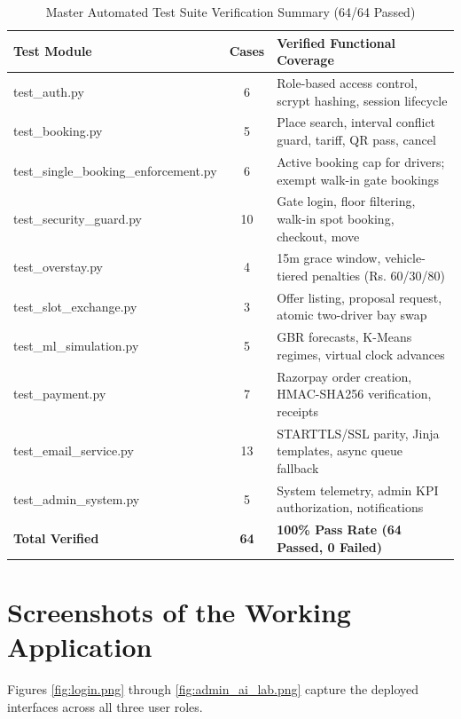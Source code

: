 \documentclass[12pt,a4paper,oneside]{report}
\begin{document}
\begin{table}[H]
\centering
\caption{Master Automated Test Suite Verification Summary (64/64 Passed)}
\label{tab:test_summary}
\begin{tabularx}{\textwidth}{>{\ttfamily}p{5.5cm} c X}
\toprule
\textbf{Test Module} & \textbf{Cases} & \textbf{Verified Functional Coverage} \\
\midrule
test\_auth.py & 6 & Role-based access control, scrypt hashing, session lifecycle \\
test\_booking.py & 5 & Place search, interval conflict guard, tariff, QR pass, cancel \\
test\_single\_booking\_enforcement.py & 6 & Active booking cap for drivers; exempt walk-in gate bookings \\
test\_security\_guard.py & 10 & Gate login, floor filtering, walk-in spot booking, checkout, move \\
test\_overstay.py & 4 & 15m grace window, vehicle-tiered penalties (Rs. 60/30/80) \\
test\_slot\_exchange.py & 3 & Offer listing, proposal request, atomic two-driver bay swap \\
test\_ml\_simulation.py & 5 & GBR forecasts, K-Means regimes, virtual clock advances \\
test\_payment.py & 7 & Razorpay order creation, HMAC-SHA256 verification, receipts \\
test\_email\_service.py & 13 & STARTTLS/SSL parity, Jinja templates, async queue fallback \\
test\_admin\_system.py & 5 & System telemetry, admin KPI authorization, notifications \\
\midrule
\textbf{Total Verified} & \textbf{64} & \textbf{100\% Pass Rate (64 Passed, 0 Failed)} \\
\bottomrule
\end{tabularx}
\end{table}

\section{Screenshots of the Working Application}
Figures \ref{fig:login.png} through \ref{fig:admin_ai_lab.png} capture the deployed interfaces across all three user roles.
\end{document}
